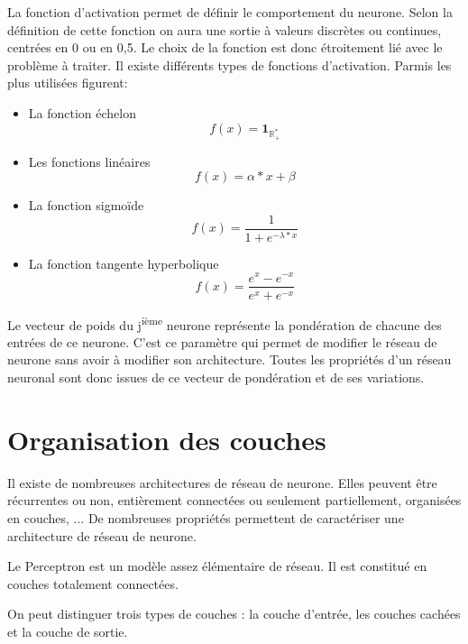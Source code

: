 \documentclass[a4paper,twoside]{report}
\begin{document}
				La fonction d'activation permet de définir le comportement du neurone. Selon la définition de cette fonction on aura une sortie à valeurs discrètes ou continues, centrées en 0 ou en 0,5. Le choix de la fonction est donc étroitement lié avec le problème à traiter.
				Il existe différents types de fonctions d'activation. Parmis les plus utilisées figurent:
				\begin{itemize}
					\item La fonction échelon
						\begin{equation}
							f(x)=\mathbf{1}_{\mathbb{R}^{*}_{+}}
						\end{equation}
					\item Les fonctions linéaires
						\begin{equation}
							f(x)=\alpha*x+\beta
						\end{equation}
					\item La fonction sigmoïde
						\begin{equation}
							f(x)=\frac{1}{1+e^{-\lambda*x}}
						\end{equation}
					\item La fonction tangente hyperbolique
						\begin{equation}
							f(x)=\frac{e^{x}-e^{-x}}{e^{x}+e^{-x}}
						\end{equation}
				\end{itemize}

				Le vecteur de poids du j\textsuperscript{ième} neurone représente la pondération de chacune des entrées de ce neurone. C'est ce paramètre qui permet de modifier le réseau de neurone sans avoir à modifier son architecture. Toutes les propriétés d'un réseau neuronal sont donc issues de ce vecteur de pondération et de ses variations.


			\section{Organisation des couches}

				Il existe de nombreuses architectures de réseau de neurone. Elles peuvent être récurrentes ou non, entièrement connectées ou seulement partiellement, organisées en couches, ... De nombreuses propriétés permettent de caractériser une architecture de réseau de neurone.

				Le Perceptron est un modèle assez élémentaire de réseau. Il est constitué en couches totalement connectées.

				On peut distinguer trois types de couches : la couche d'entrée, les couches cachées et la couche de sortie.\\
\end{document}
